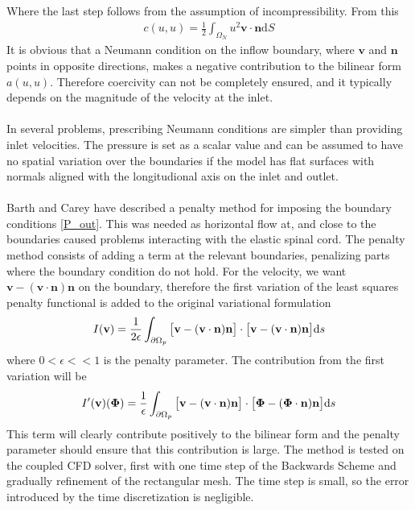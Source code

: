 Where the last step follows from the assumption of incompressibility. From this
\begin{align}
c(u,u) = \frac{1}{2}\int_{\Omega_N} u^2 \mathbf{v} \cdot \mathbf{n} \mathrm{d}S
\end{align}
It is obvious that a Neumann condition on the inflow boundary, where $\mathbf{v}$ and $\mathbf{n}$ points in opposite directions, makes a negative contribution to the bilinear form $a(u,u)$. Therefore coercivity can not be completely ensured, and it typically depends on the magnitude of the velocity at the inlet. 
\\
\\
In several problems, prescribing Neumann conditions are simpler than providing inlet velocities. The pressure is set as a scalar value and can be assumed to have no spatial variation over the boundaries if the model has flat surfaces with normals aligned with the longitudional axis on the inlet and outlet. 
\\
\\
Barth and Carey \cite{Bart07} have described a penalty method for imposing the boundary conditions \eqref{P_out}. This was needed as horizontal flow at, and close to the boundaries caused problems interacting with the elastic spinal cord. The penalty method consists of adding a term at the relevant boundaries, penalizing parts where the boundary condition do not hold. For the velocity, we want $\mathbf{v} - (\mathbf{v}\cdot \mathbf{n})\mathbf{n}$ on the boundary, therefore the first variation of the least squares penalty functional is added to the original variational formulation
\begin{align}
I(\mathbf{v}) = \frac{1}{2\epsilon}\int_{\partial \Omega_p}\big{[}\mathbf{v} - (\mathbf{v}\cdot \mathbf{n})\mathbf{n}\big{]}\cdot\big{[}\mathbf{v} - (\mathbf{v}\cdot \mathbf{n})\mathbf{n}\big{]} \mathrm{d}s
\end{align}
where $0<\epsilon<<1$ is the penalty parameter. The contribution from the first variation will be
\begin{align}
I'(\mathbf{v})(\mathbf{\Phi}) = \frac{1}{\epsilon}\int_{\partial \Omega_p}\big{[}\mathbf{v} - (\mathbf{v}\cdot \mathbf{n})\mathbf{n}\big{]}\cdot\big{[}\mathbf{\Phi} - (\mathbf{\Phi}\cdot \mathbf{n})\mathbf{n}\big{]} \mathrm{d}s
\end{align}
This term will clearly contribute positively to the bilinear form and the penalty parameter should ensure that this contribution is large.
The method is tested on the coupled CFD solver, first with one time step of the Backwards Scheme and gradually refinement of the rectangular mesh. The time step is small, so the error introduced by the time discretization is negligible.

